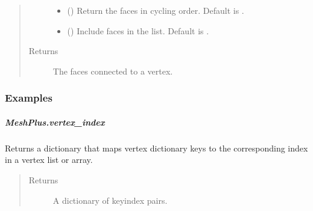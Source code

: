 \documentclass[letterpaper,10pt,english]{sphinxmanual}
\begin{document}
\begin{fulllineitems}
\begin{fulllineitems}
\begin{quote}
\begin{description}
\begin{itemize}
\item {} 
 () \textendash{} Return the faces in cycling order.
Default is .

\item {} 
 () \textendash{} Include  faces in the list.
Default is .

\end{itemize}

\item[{Returns}] \leavevmode
{} \textendash{} The faces connected to a vertex.

\end{description}\end{quote}
\subsubsection*{Examples}

\begin{sphinxVerbatim}[commandchars=\\\{\}]
\end{sphinxVerbatim}

\end{fulllineitems}



\subparagraph{MeshPlus.vertex\_index}
\label{\detokenize{api/generated/directional_clustering.mesh.MeshPlus.vertex_index:meshplus-vertex-index}}\label{\detokenize{api/generated/directional_clustering.mesh.MeshPlus.vertex_index::doc}}

\begin{fulllineitems}
\label{\detokenize{api/generated/directional_clustering.mesh.MeshPlus.vertex_index:directional_clustering.mesh.MeshPlus.vertex_index}}
Returns a dictionary that maps vertex dictionary keys to the
corresponding index in a vertex list or array.
\begin{quote}\begin{description}
\item[{Returns}] \leavevmode
{} \textendash{} A dictionary of key\sphinxhyphen{}index pairs.


\end{description}
\end{quote}
\end{fulllineitems}
\end{fulllineitems}
\end{document}
